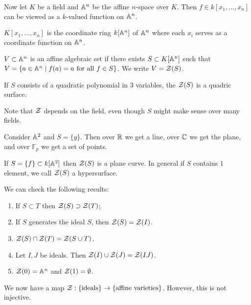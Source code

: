 \documentclass[10pt, twoside]{article}
\newcommand{\F}{\mathbb{F}}
\begin{document}
        Now let $K$ be a field and $\mathbb{A}^n$ be the affine $n$-space over $K$. Then $f \in k[x_1, \ldots, x_n]$ can be viewed as a $k$-valued function on $\mathbb{A}^n$.
        \begin{defn}
            $K[x_1, \ldots, x_n]$ is the coordinate ring $k[\mathbb{A}^n]$ of $\mathbb{A}^n$ where each $x_i$ serves as a coordinate function on $\mathbb{A}^n$.
        \end{defn}

        \begin{defn}
            $V \subset \mathbb{A}^n$ is an affine algebraic set if there exists $S \subset K[\mathbb{A}^n]$ such that $V = \{a \in \mathbb{A}^n \mid f(a) = a \text{ for all } f \in S \}$. We write $V = \mathcal{Z}(S)$.
        \end{defn}

        \begin{exm}
            If $S$ consists of a quadratic polynomial in $3$ variables, the $\mathcal{Z}(S)$ is a quadric surface.
        \end{exm}

        Note that $\mathcal{Z}$ depends on the field, even though $S$ might make sense over many fields.
        \begin{exm}
            Consider $\mathbb{A}^2$ and $S = \{y\}$. Then over $\mathbb{R}$ we get a line, over $\mathbb{C}$ we get the plane, and over $\F_p$ we get a set of points.
        \end{exm}

        \begin{exm}
            If $S = \{f\} \subset k[\mathbb{A}^2]$ then $\mathcal{Z}(S)$ is a plane curve. In general if $S$ contains $1$ element, we call $\mathcal{Z}(S)$ a hypersurface.
        \end{exm}

        We can check the following results:
        \begin{enumerate}
            \item If $S \subset T$ then $\mathcal{Z}(S) \supset \mathcal{Z}(T)$;
            \item If $S$ generates the ideal $S$, then $\mathcal{Z}(S) = \mathcal{Z}(I)$.
            \item $\mathcal{Z}(S) \cap \mathcal{Z}(T) = \mathcal{Z}(S \cup T)$.
            \item Let $I,J$ be ideals. Then $\mathcal{Z}(I) \cup \mathcal{Z}(J) = \mathcal{Z}(IJ)$.
            \item $\mathcal{Z}(0) = \mathbb{A}^n$ and $\mathcal{Z}(1) = \emptyset$.
        \end{enumerate}

        We now have a map $\mathcal{Z}: \{\text{ideals}\} \to \{\text{affine varieties}\}$. However, this is not injective.
\end{document}
